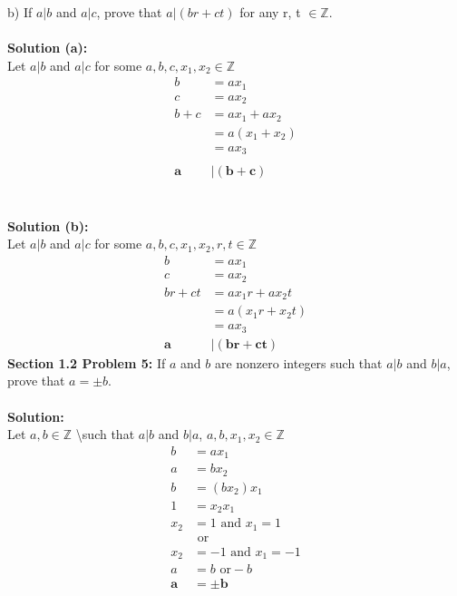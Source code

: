 \documentclass[12pt]{article}
\begin{document}
b) If $a|b$ and $a|c$, prove that $a|(br + ct)$ for any r, t $\in \mathbb{Z}$. 
\\\\
\textbf{Solution (a): } \\
Let $a|b$ and $a|c$ for some $a,b,c,x_1,x_2 \in \mathbb{Z}$ \\
	\begin{align}
		b &= ax_1 \\
		c &= ax_2 \\
		b + c &= ax_1 + ax_2 \\
		&= a(x_1 + x_2) \\
		&= ax_3 
		\\\\
		\boldsymbol{a} &| \boldsymbol{(b + c)} 
	\end{align}
\\\\
\textbf{Solution (b): } \\
Let $a|b$ and $a|c$ for some $a,b,c,x_1,x_2,r,t \in \mathbb{Z}$ \\
	\begin{align}
		b &= ax_1 \\
		c &= ax_2 \\
		br + ct &= ax_1r + ax_2t \\
		&= a(x_1r + x_2t) \\
		&= ax_3 \\
		\boldsymbol{a} &| \boldsymbol{(br + ct)} 
	\end{align}
\newpage
\noindent \textbf{Section 1.2 Problem 5: } 
If $a$ and $b$ are nonzero integers such that $a|b$ and $b|a$, prove that $a = \pm b$. 
\\\\
\textbf{Solution: } \\
Let $a, b \in \mathbb{Z}$ \textbackslash {}\textbraceright \space such that $a|b$ and $b|a$, \quad  $a,b,x_1,x_2 \in \mathbb{Z}$
	\begin{align}
		b &= ax_1 \\
		a &= bx_2 \\
		b &= (bx_2)x_1 \\
		1 &= x_2 x_1 \\
		x_2 &= 1 \text{ and } x_1 = 1 \\
		&\text{ or}  \\
		x_2 &= -1 \text{ and } x_1 = -1 \\
		a &= b \text{ or} -b \\
		\boldsymbol{a} &= \boldsymbol{\pm b}
	\end{align}
\end{document}
